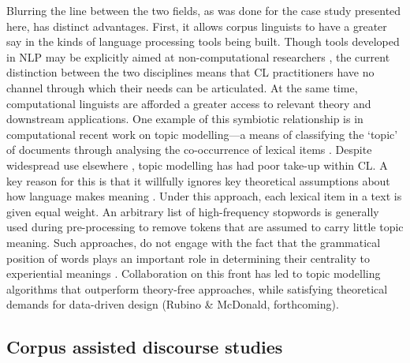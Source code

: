 Blurring the line between the two fields, as was done for the case study presented here, has distinct advantages. First, it allows corpus linguists to have a greater say in the kinds of language processing tools being built. Though tools developed in \gls{NLP} may be explicitly aimed at non\hyp{}computational researchers \cite{de2008stanford}, the current distinction between the two disciplines means that \gls{CL} practitioners have no channel through which their needs can be articulated. At the same time, computational linguists are afforded a greater access to relevant theory and downstream applications. One example of this symbiotic relationship is in computational recent work on topic modelling---a means of classifying the `topic' of documents through analysing the co\hyp{}occurrence of lexical items \cite{blei2003latent}. Despite widespread use elsewhere \cite[e.g. history\slash digital humanities---see][]{blevins_topic_2010,brauer_digital_2014,yang_topic_2011}, topic modelling has had poor take\hyp{}up within \gls{CL}. A key reason for this is that it willfully ignores key theoretical assumptions about how language makes meaning \cite{boyd-graber_syntactic_2009}. Under this approach, each lexical item in a text is given equal weight. An arbitrary list of high\hyp{}frequency stopwords is generally used during pre\hyp{}processing to remove tokens that are assumed to carry little topic meaning. Such approaches, do not engage with the fact that the grammatical position of words plays an important role in determining their centrality to experiential meanings \cite{halliday_introduction_2004}. Collaboration on this front has led to topic modelling algorithms that outperform theory\hyp{}free approaches, while satisfying theoretical demands for data\hyp{}driven design (Rubino \& McDonald, forthcoming).



\subsection{Corpus assisted discourse studies}


